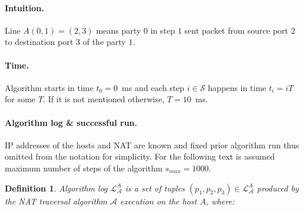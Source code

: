 \documentclass[twoside]{article}
\newtheorem{mydef}{Definition}
\begin{document}
\begin{multicols}{2}
\paragraph{Intuition.} 
Line $A(0,1) = (2,3)$ means party $0$ in step $1$ sent packet from source port $2$ to destination port $3$
of the party $1$.

\paragraph{Time.} 
Algorithm starts in time $t_0 = 0$~ms and each step $i \in \mathcal{S}$
happens in time $t_i = iT$ for some $T$. If it is not mentioned otherwise, $T = 10$~ms.


\paragraph{Algorithm log \& successful run.} IP addresses of the hosts and NAT are known and fixed prior algorithm run thus omitted
from the notation for simplicity. For the following text is assumed maximum number of steps of the algorithm $s_{max}=1000$.

\begin{mydef}
\label{def:log}
Algorithm log $\mathcal{L}^A_{\mathcal{A}}$ is a set of tuples $(p_1, p_2, p_3) \in \mathcal{L}^A_{\mathcal{A}}$ produced
by the NAT traversal algorithm $\mathcal{A}$ execution on the host $A$, where: \\


\end{mydef}
\end{multicols}
\end{document}

